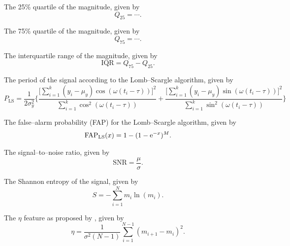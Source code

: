 \begin{enumerate}
 The 25\% quartile of the magnitude, given by
\begin{equation}Q_{25} = \cdots.\end{equation}

 The 75\% quartile of the magnitude, given by
\begin{equation}Q_{75} = \cdots.\end{equation}

 The interquartile range of the magnitude, given by
\begin{equation}\text{IQR} = Q_{75} -Q_{25}.\end{equation}

 The period of the signal according to the Lomb--Scargle algorithm, given by
\begin{equation}P_{\text{LS}} = \frac{1}{2 \sigma_y^2} \Bigg\{ \frac{\big[\sum\limits_{i=1}^k (y_i - \mu_y) \cos(\omega(t_i - \tau))\big]^2}{\sum\limits_{i=1}^k \cos^2(\omega(t_i - \tau))} + \frac{\big[\sum\limits_{i=1}^k (y_i - \mu_y) \sin(\omega(t_i - \tau))\big]^2}{\sum\limits_{i=1}^k \sin^2(\omega(t_i - \tau))}\Bigg\}\end{equation}

 The false--alarm probability (FAP) for the Lomb--Scargle algorithm, given by
\begin{equation}\text{FAP}_{\text{LS}}(x) = 1 - (1 - \mathrm{e}^{-x})^M.\end{equation}

 The signal--to--noise ratio, given by
\begin{equation}\text{SNR} = \frac{\mu}{\sigma}.\end{equation}

 The Shannon entropy of the signal, given by
\begin{equation}S = -\sum\limits_{i=1}^N m_i \ln(m_i).\end{equation}

 The $\eta$ feature as proposed by \citep{}, given by
\begin{equation}\eta = \frac{1}{\sigma^2 (N-1)} \sum\limits_{i=1}^{N-1} (m_{i+1} - m_{i})^2.\end{equation}


\end{enumerate}
